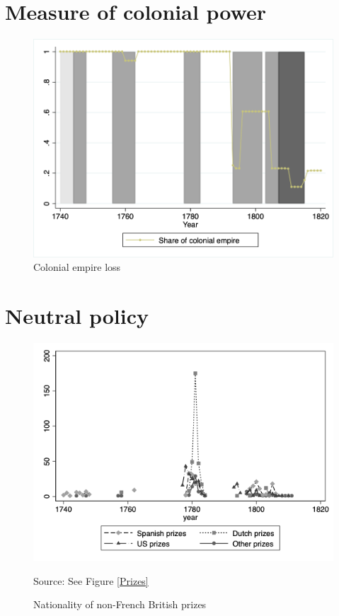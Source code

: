 \documentclass[12pt,a4paper,notitlepage,english]{article}
\newcommand{\source}[1]{\caption*{\footnotesize Source: {#1}} }
\begin{document}
\begin{appendix}
\section{Measure of colonial power}
\begin{center}
\begin{figure}[h!]
\caption{Colonial empire loss}
\label{colony_loss}
\centering
\includegraphics[scale=.51]{colony_loss.png}
\end{figure}
\end{center}

\section{Neutral policy}
\begin{center}
	\begin{figure}[h!]
		\caption{Nationality of non-French British prizes}
		\label{Prizes_nationality}
		\centering
		\includegraphics[scale=.51]{Prizes_nationality.png}
		\source{See Figure \ref{Prizes}}
	\end{figure}
\end{center}



\end{appendix}
\end{document}
